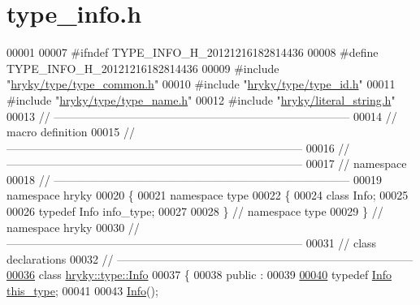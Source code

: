 \hypertarget{type__info_8h_source}{\section{type\-\_\-info.\-h}
}

\begin{DoxyCode}
00001 
00007 \textcolor{preprocessor}{#ifndef TYPE\_INFO\_H\_20121216182814436}
00008 \textcolor{preprocessor}{}\textcolor{preprocessor}{#define TYPE\_INFO\_H\_20121216182814436}
00009 \textcolor{preprocessor}{}\textcolor{preprocessor}{#include "\hyperlink{type__common_8h}{hryky/type/type_common.h}"}
00010 \textcolor{preprocessor}{#include "\hyperlink{type__id_8h}{hryky/type/type_id.h}"}
00011 \textcolor{preprocessor}{#include "\hyperlink{type__name_8h}{hryky/type/type_name.h}"}
00012 \textcolor{preprocessor}{#include "\hyperlink{literal__string_8h}{hryky/literal_string.h}"}
00013 \textcolor{comment}{//
      ------------------------------------------------------------------------------}
00014 \textcolor{comment}{// macro definition}
00015 \textcolor{comment}{//
      ------------------------------------------------------------------------------}
00016 \textcolor{comment}{//
      ------------------------------------------------------------------------------}
00017 \textcolor{comment}{// namespace}
00018 \textcolor{comment}{//
      ------------------------------------------------------------------------------}
00019 \textcolor{keyword}{namespace }hryky
00020 \{
00021 \textcolor{keyword}{namespace }type
00022 \{
00024     \textcolor{keyword}{class }Info;
00025 
00026     \textcolor{keyword}{typedef} Info info\_type;
00027 
00028 \} \textcolor{comment}{// namespace type}
00029 \} \textcolor{comment}{// namespace hryky}
00030 \textcolor{comment}{//
      ------------------------------------------------------------------------------}
00031 \textcolor{comment}{// class declarations}
00032 \textcolor{comment}{//
      ------------------------------------------------------------------------------}
\hypertarget{type__info_8h_source_l00036}{}\hyperlink{classhryky_1_1type_1_1_info}{00036} \textcolor{comment}{}\textcolor{keyword}{class }\hyperlink{classhryky_1_1type_1_1_info}{hryky::type::Info}
00037 \{
00038 \textcolor{keyword}{public} :
00039 
\hypertarget{type__info_8h_source_l00040}{}\hyperlink{classhryky_1_1type_1_1_info_add4519e2ccc4c1ea0266694bc15135b7}{00040}     \textcolor{keyword}{typedef} \hyperlink{classhryky_1_1type_1_1_info}{Info} \hyperlink{classhryky_1_1type_1_1_info_add4519e2ccc4c1ea0266694bc15135b7}{this_type};
00041 
00043     \hyperlink{classhryky_1_1type_1_1_info_ae457ac9d30765e0a6513c9566c705a89}{Info}();

\end{DoxyCode}
